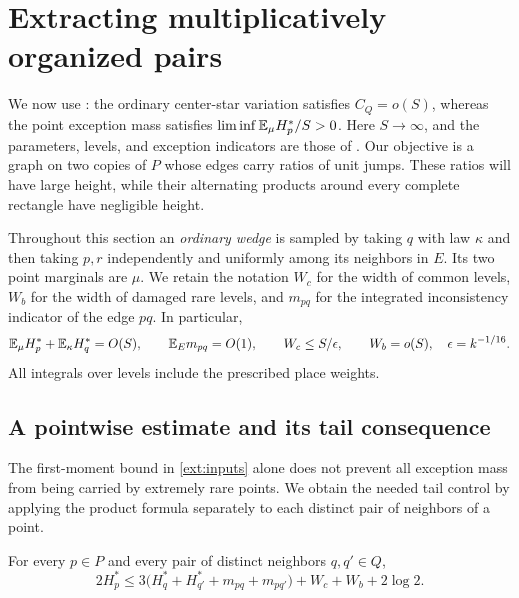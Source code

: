 \section{Extracting multiplicatively organized pairs}\label{sec:extraction}

We now use : the ordinary center-star
variation satisfies \(C_Q=o(S)\), whereas the point exception mass satisfies
\(\liminf \mathbb E_\mu H_p^*/S>0\).  Here \(S\to\infty\), and the parameters,
levels, and exception indicators are those of .
Our objective is a graph on two copies of \(P\) whose edges carry ratios of
unit jumps.  These ratios will have large height, while their alternating
products around every complete rectangle have negligible height.

Throughout this section an \emph{ordinary wedge} is sampled by taking
\(q\) with law \(\kappa\) and then taking \(p,r\) independently and uniformly
among its neighbors in \(E\).  Its two point marginals are \(\mu\).
We retain the notation \(W_c\) for the width of common levels, \(W_b\) for
the width of damaged rare levels, and \(m_{pq}\) for the integrated
inconsistency indicator of the edge \(pq\).  In particular,
\begin{equation}\label{ext:inputs}
 \mathbb E_\mu H_p^*+\mathbb E_\kappa H_q^*=O(S),\qquad
 \mathbb E_E m_{pq}=O(1),\qquad
 W_c\le S/\epsilon,\qquad W_b=o(S),
 \quad \epsilon=k^{-1/16}.
\end{equation}
All integrals over levels include the prescribed place weights.

\subsection{A pointwise estimate and its tail consequence}

The first-moment bound in \eqref{ext:inputs} alone does not prevent all
exception mass from being carried by extremely rare points.  We obtain the
needed tail control by applying the product formula separately to each
distinct pair of neighbors of a point.

\begin{lemma}\label{ext:pointwise}
For every \(p\in P\) and every pair of distinct neighbors \(q,q'\in Q\),
\begin{equation}\label{ext:pointwise-bound}
 2H_p^*\le
 3\bigl(H_q^*+H_{q'}^*+m_{pq}+m_{pq'}\bigr)
       +W_c+W_b+2\log 2.
\end{equation}
\end{lemma}

